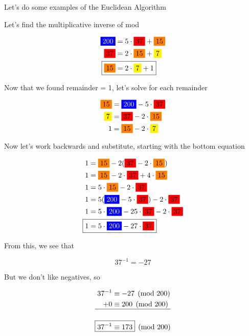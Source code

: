 \documentclass[../../Main.tex]{subfiles}
\begin{document}
\begin{example}
    Let's do some examples of the Euclidean Algorithm

    Let's find the multiplicative inverse of  mod 

    \begin{align*}
        \bluebox{200} &= 5 \cdot \redbox{37} + \orangebox{15} \\
        \redbox{37} &= 2 \cdot \orangebox{15} + \yellowbox{7} \\
        \Aboxed{\orangebox{15} &= 2 \cdot \yellowbox{7} + 1} \\
    \end{align*}

    Now that we found remainder = 1, let's solve for each remainder

    \begin{align*}
        \orangebox{15} &= \bluebox{200} - 5 \cdot \redbox{37} \\
        \yellowbox{7} &= \redbox{37} - 2 \cdot \orangebox{15} \\
        1 &= \orangebox{15} - 2 \cdot \yellowbox{7}
    \end{align*}

    Now let's work backwards and substitute, starting with the bottom equation

    \begin{align*}
        1 &= \orangebox{15} - 2(\redbox{37} - 2 \cdot \orangebox{15}) \\
        1 &= \orangebox{15} - 2 \cdot \redbox{37} + 4 \cdot \orangebox{15} \\
        1 &= 5 \cdot \orangebox{15} - 2 \cdot \redbox{37} \\
        1 &= 5 (\bluebox{200} - 5 \cdot \redbox{37}) - 2 \cdot \redbox{37} \\
        1 &= 5 \cdot \bluebox{200} - 25 \cdot \redbox{37} - 2 \cdot \redbox{37} \\
        \Aboxed{1 &= 5 \cdot \bluebox{200} - 27 \cdot \redbox{37}} \\
    \end{align*}

    From this, we see that

    $$37^{-1} = -27$$

    But we don't like negatives, so

    \begin{align*}
        37^{-1} &\equiv -27 \pmod{200} \\
        +0 &\equiv 200 \pmod{200} \\
        \hline \\
        \Aboxed{37^{-1} &\equiv 173} \pmod{200}
    \end{align*}
\end{example}
\end{document}
